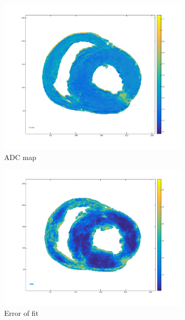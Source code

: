 \begin{figure}
    \centering
    \begin{subfigure}{.31\textwidth}
        \includegraphics[width=\textwidth]{figures/pig2_adc_31}
        \caption{ADC map}
        \label{fig:pig2_adc}
    \end{subfigure}
    \begin{subfigure}{.31\textwidth}
        \includegraphics[width=\textwidth]{figures/pig2_err_31}
        \caption{Error of fit}
        \label{fig:pig2_err}
    \end{subfigure}
    \begin{subfigure}{.31\textwidth}

\end{subfigure}
\end{figure}
